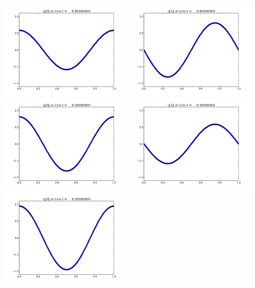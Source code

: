 \documentclass[11pt]{article}
\begin{document}
\vskip 10pt 
\includegraphics[width=0.475\textwidth]{frame0017fig0.png}
\includegraphics[width=0.475\textwidth]{frame0017fig1.png}
\vskip 10pt 
\includegraphics[width=0.475\textwidth]{frame0018fig0.png}
\includegraphics[width=0.475\textwidth]{frame0018fig1.png}
\vskip 10pt 
\includegraphics[width=0.475\textwidth]{frame0019fig0.png}
\end{document}
